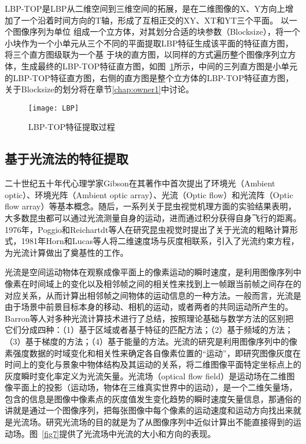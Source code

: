 LBP-TOP是LBP从二维空间到三维空间的拓展，是在二维图像的X、Y方向上增加了一个沿着时间方向的T轴，形成了互相正交的XY、XT和YT三个平面。 以一个图像序列为单位
组成一个立方体，对其划分合适的块参数（Blocksize），将一个小块作为一个小单元从三个不同的平面提取LBP特征生成该平面的特征直方图，将三个直方图级联为一个基
于块的直方图，以同样的方式遍历整个图像序列立方体，生成最终的LBP-TOP特征直方图，如图~\ref{fig6}所示，中间的三列直方图是小单元的LBP-TOP特征直方图，右侧的直方图是整个立方体的LBP-TOP特征直方图，关于Blocksize的划分将在章节\ref{chap:owner1}中讨论。

\begin{figure}[!htbp]
    \centering
    \texttt{[image: LBP]}
    \caption{LBP-TOP特征提取过程}
    \label{fig6}
\end{figure}

\subsection{基于光流法的特征提取}

二十世纪五十年代心理学家Gibson在其著作中首次提出了环境光（Ambient optic）、环境光阵（Ambient optic array）、光流（Optic flow）和光流阵（Optic flow array）等基本概念。随后，一系列关于昆虫视觉机理方面的实验结果表明，大多数昆虫都可以通过光流测量自身的运动，进而通过积分获得自身飞行的距离。1976年，Poggio和Reichartdt等人在研究昆虫视觉时提出了关于光流的粗略计算形式\citep{poggio1976visual}，1981年Horn和Lucas等人将二维速度场与灰度相联系，引入了光流约束方程，为光流计算做出了奠基性的工作\citep{Lucas1981, HORN1981185}。

光流是空间运动物体在观察成像平面上的像素运动的瞬时速度，是利用图像序列中像素在时间域上的变化以及相邻帧之间的相关性来找到上一帧跟当前帧之间存在的对应关系，从而计算出相邻帧之间物体的运动信息的一种方法。一般而言，光流是由于场景中前景目标本身的移动、相机的运动，或者两者的共同运动所产生的。Barron等人对多种光流计算技术进行了总结，按照理论基础与数学方法的区别把它们分成四种：（1）基于区域或者基于特征的匹配方法；（2）基于频域的方法；（3）基于梯度的方法；（4）基于能量的方法\citep{Barron1992}。光流的研究是利用图像序列中的像素强度数据的时域变化和相关性来确定各自像素位置的“运动”，即研究图像灰度在时间上的变化与景象中物体结构及其运动的关系，将二维图像平面特定坐标点上的灰度瞬时变化率定义为光流矢量。光流场（optical flow field）是运动场在二维图像平面上的投影（运动场，物体在三维真实世界中的运动），是一个二维矢量场，包含的信息是图像中像素点的灰度值发生变化趋势的瞬时速度矢量信息，那通俗的讲就是通过一个图像序列，把每张图像中每个像素的运动速度和运动方向找出来就是光流场。研究光流场的目的就是为了从图像序列中近似计算出不能直接得到的运动场。图~\ref{fig7}提供了光流场中光流的大小和方向的表现。


